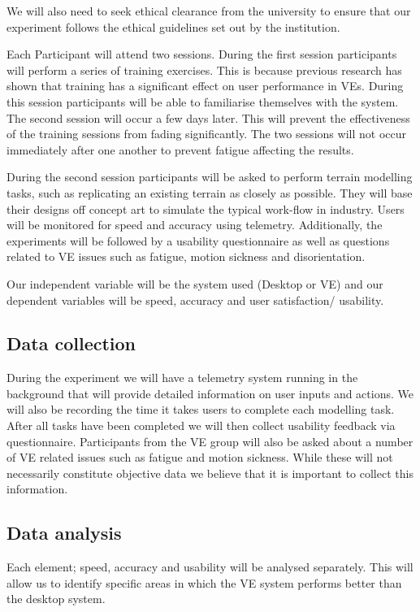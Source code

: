 \documentclass{sig-alternate-05-2015}
\begin{document}
We will also need to seek ethical clearance from the university to ensure that our experiment follows the ethical guidelines set out by the institution.

Each Participant will attend two sessions. During the first session participants will perform a series of training exercises. This is because  previous research has shown that training has a significant effect on user performance in VEs\cite{Schultheis2012}. During this session participants will be able to familiarise themselves with the system. The second session will occur a few days later. This will prevent the effectiveness of the training sessions from fading significantly. The two sessions will not occur immediately after one another to prevent fatigue affecting the results.

During the second session participants will be asked to perform terrain modelling tasks, such as replicating an existing terrain as closely as possible. They will base their designs off concept art to simulate the typical work-flow in industry. Users will be monitored for speed and accuracy using telemetry. Additionally, the experiments will be followed by a usability questionnaire as well as questions related to VE issues such as fatigue, motion sickness and disorientation.

Our independent variable will be the system used (Desktop or VE) and our dependent variables will be speed, accuracy and user satisfaction/ usability.

\subsection{Data collection}
During the experiment we will have a telemetry system running in the background that will provide detailed information on user inputs and actions. We will also be recording the time it takes users to complete each modelling task. After all tasks have been completed we will then collect usability feedback via questionnaire. Participants from the VE group will also be asked about a number of VE related issues such as fatigue and motion sickness. While these will not necessarily constitute objective data we believe that it is important to collect this information.
\subsection{Data analysis}
Each element; speed, accuracy and usability will be analysed separately. This will allow us to identify specific areas in which the VE system performs better than the desktop system.
\end{document}
